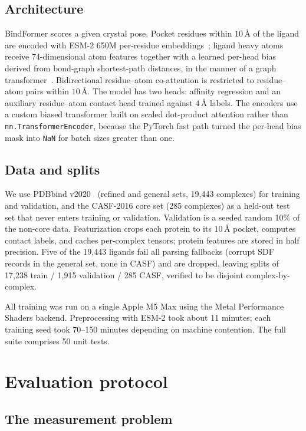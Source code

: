 \documentclass[11pt]{article}
\newcommand{\code}[1]{\texttt{#1}}
\newcommand{\Ang}{\mbox{\AA}}  %
\begin{document}
\subsection{Architecture}

BindFormer scores a given crystal pose. Pocket residues within $10\,\Ang$ of the ligand are
encoded with ESM-2 650M per-residue embeddings~\cite{esm2}; ligand heavy atoms receive
74-dimensional atom features together with a learned per-head bias derived from bond-graph
shortest-path distances, in the manner of a graph transformer~\cite{graphormer}.
Bidirectional residue--atom co-attention is restricted to residue--atom pairs within
$10\,\Ang$. The model has two heads: affinity regression and an auxiliary residue--atom
contact head trained against $4\,\Ang$ labels. The encoders use a custom biased transformer
built on scaled dot-product attention rather than \code{nn.TransformerEncoder}, because the
PyTorch fast path turned the per-head bias mask into \code{NaN} for batch sizes greater than
one.

\subsection{Data and splits}

We use PDBbind v2020~\cite{pdbbind} (refined and general sets, 19{,}443 complexes) for
training and validation, and the CASF-2016 core set (285 complexes) as a held-out test set
that never enters training or validation. Validation is a seeded random 10\% of the
non-core data. Featurization crops each protein to its $10\,\Ang$ pocket, computes contact
labels, and caches per-complex tensors; protein features are stored in half precision.
Five of the 19{,}443 ligands fail all parsing fallbacks (corrupt SDF records in the general
set, none in CASF) and are dropped, leaving splits of 17{,}238 train / 1{,}915 validation /
285 CASF, verified to be disjoint complex-by-complex.

All training was run on a single Apple M5 Max using the Metal Performance Shaders backend.
Preprocessing with ESM-2 took about 11 minutes; each training seed took 70--150 minutes
depending on machine contention. The full suite comprises 50 unit tests.

\section{Evaluation protocol}

\subsection{The measurement problem}
\end{document}
